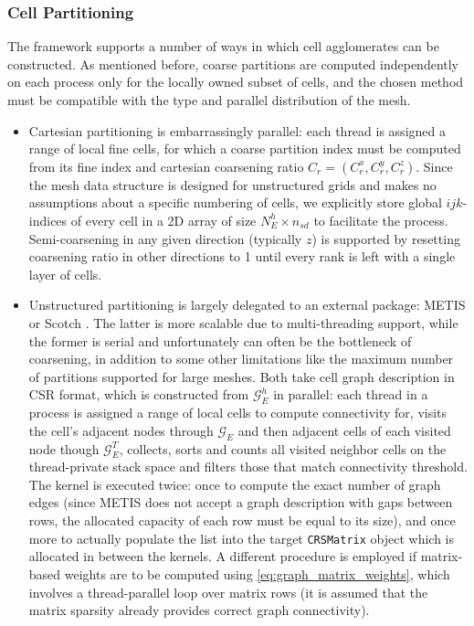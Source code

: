 \subsubsection{Cell Partitioning}
\label{subsubsec:par_kernels_coarsening_cells}

The framework supports a number of ways in which cell agglomerates can be constructed.   As mentioned before, coarse partitions are computed independently on each process only for the locally owned subset of cells, and the chosen method must be compatible with the type and parallel distribution of the mesh.
\begin{itemize}
\item Cartesian partitioning is embarrassingly parallel: each thread is assigned a range of local fine cells, for which a coarse partition index must be computed from its fine index and cartesian coarsening ratio $C_r = (C_r^x, C_r^y, C_r^z)$.   Since the mesh data structure is designed for unstructured grids and makes no assumptions about a specific numbering of cells, we explicitly store global $ijk$-indices of every cell in a 2D array of size $N_E^h \times n_{sd}$ to facilitate the process.   Semi-coarsening in any given direction (typically $z$) is supported by resetting coarsening ratio in other directions to 1 until every rank is left with a single layer of cells.
\item Unstructured partitioning is largely delegated to an external package: METIS \cite{Karypis1999} or Scotch \cite{Chevalier2008}. The latter is more scalable due to multi-threading support, while the former is serial and unfortunately can often be the bottleneck of coarsening, in addition to some other limitations like the maximum number of partitions supported for large meshes.   Both take cell graph description in CSR format, which is constructed from $\mathcal{G}_E^h$ in parallel: each thread in a process is assigned a range of local cells to compute connectivity for, visits the cell's adjacent nodes through $\mathcal{G}_E$ and then adjacent cells of each visited node though $\mathcal{G}_E^T$, collects, sorts and counts all visited neighbor cells on the thread-private stack space and filters those that match connectivity threshold.   The kernel is executed twice: once to compute the exact number of graph edges (since METIS does not accept a graph description with gaps between rows, the allocated capacity of each row must be equal to its size), and once more to actually populate the list into the target \texttt{CRSMatrix} object which is allocated in between the kernels.   A different procedure is employed if matrix-based weights are to be computed using \eqref{eq:graph_matrix_weights}, which involves a thread-parallel loop over matrix rows (it is assumed that the matrix sparsity already provides correct graph connectivity).

\end{itemize}
